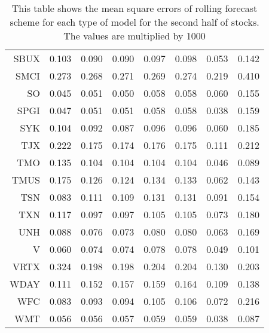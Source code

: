 \begin{table}[ht]
\begin{tabular}{rrrrrrrr}
  SBUX & 0.103 & 0.090 & 0.090 & 0.097 & 0.098 & 0.053 & 0.142 \\ 
  SMCI & 0.273 & 0.268 & 0.271 & 0.269 & 0.274 & 0.219 & 0.410 \\ 
  SO & 0.045 & 0.051 & 0.050 & 0.058 & 0.058 & 0.060 & 0.155 \\ 
  SPGI & 0.047 & 0.051 & 0.051 & 0.058 & 0.058 & 0.038 & 0.159 \\ 
  SYK & 0.104 & 0.092 & 0.087 & 0.096 & 0.096 & 0.060 & 0.185 \\ 
  TJX & 0.222 & 0.175 & 0.174 & 0.176 & 0.175 & 0.111 & 0.212 \\ 
  TMO & 0.135 & 0.104 & 0.104 & 0.104 & 0.104 & 0.046 & 0.089 \\ 
  TMUS & 0.175 & 0.126 & 0.124 & 0.134 & 0.133 & 0.062 & 0.143 \\ 
  TSN & 0.083 & 0.111 & 0.109 & 0.131 & 0.131 & 0.091 & 0.154 \\ 
  TXN & 0.117 & 0.097 & 0.097 & 0.105 & 0.105 & 0.073 & 0.180 \\ 
  UNH & 0.088 & 0.076 & 0.073 & 0.080 & 0.080 & 0.063 & 0.169 \\ 
  V & 0.060 & 0.074 & 0.074 & 0.078 & 0.078 & 0.049 & 0.101 \\ 
  VRTX & 0.324 & 0.198 & 0.198 & 0.204 & 0.204 & 0.130 & 0.203 \\ 
  WDAY & 0.111 & 0.152 & 0.157 & 0.159 & 0.164 & 0.109 & 0.138 \\ 
  WFC & 0.083 & 0.093 & 0.094 & 0.105 & 0.106 & 0.072 & 0.216 \\ 
  WMT & 0.056 & 0.056 & 0.057 & 0.059 & 0.059 & 0.038 & 0.087 \\ 
   \hline
\end{tabular}
\caption[MSE rolling forecast (2)]{This table shows the mean square errors of rolling forecast scheme for each type of model for the second half of stocks. 
                     The values are multiplied by 1000} 
\label{Table:MSE_r_2}
\end{table}
